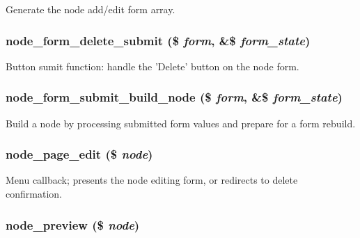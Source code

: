 Generate the node add/edit form array. \hypertarget{node_8pages_8inc_5cdd62f89098801ac87b85d8c61e7ee2}{
\subsubsection[{node\_\-form\_\-delete\_\-submit}]{\setlength{\rightskip}{0pt plus 5cm}node\_\-form\_\-delete\_\-submit (\$ {\em form}, \/  \&\$ {\em form\_\-state})}}
\label{node_8pages_8inc_5cdd62f89098801ac87b85d8c61e7ee2}


Button sumit function: handle the 'Delete' button on the node form. \hypertarget{node_8pages_8inc_09cc7aec34e871fc093e18e18b8f4889}{
\subsubsection[{node\_\-form\_\-submit\_\-build\_\-node}]{\setlength{\rightskip}{0pt plus 5cm}node\_\-form\_\-submit\_\-build\_\-node (\$ {\em form}, \/  \&\$ {\em form\_\-state})}}
\label{node_8pages_8inc_09cc7aec34e871fc093e18e18b8f4889}


Build a node by processing submitted form values and prepare for a form rebuild. \hypertarget{node_8pages_8inc_553fc35bb17545341a3fcc36360fb43b}{
\subsubsection[{node\_\-page\_\-edit}]{\setlength{\rightskip}{0pt plus 5cm}node\_\-page\_\-edit (\$ {\em node})}}
\label{node_8pages_8inc_553fc35bb17545341a3fcc36360fb43b}


Menu callback; presents the node editing form, or redirects to delete confirmation. \hypertarget{node_8pages_8inc_774d9df7be341a7c9058555e8cfb4b2b}{
\subsubsection[{node\_\-preview}]{\setlength{\rightskip}{0pt plus 5cm}node\_\-preview (\$ {\em node})}}
\label{node_8pages_8inc_774d9df7be341a7c9058555e8cfb4b2b}


